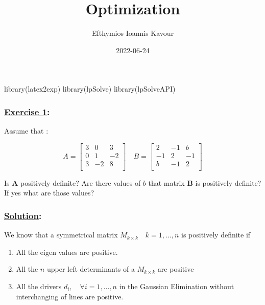 \documentclass[
]{article}
\title{Optimization}
\author{Efthymios Ioannis Kavour}
\date{2022-06-24}
\newenvironment{Shaded}{\begin{snugshade}}{\end{snugshade}}
\newcommand{\FunctionTok}[1]{\textcolor[rgb]{0.00,0.00,0.00}{#1}}
\newcommand{\NormalTok}[1]{#1}
\providecommand{\tightlist}{%
  \setlength{\itemsep}{0pt}\setlength{\parskip}{0pt}}
\begin{document}
\maketitle

\begin{Shaded}
\begin{Highlighting}[]
\FunctionTok{library}\NormalTok{(latex2exp)}
\FunctionTok{library}\NormalTok{(lpSolve)}
\FunctionTok{library}\NormalTok{(lpSolveAPI)}
\end{Highlighting}
\end{Shaded}

\hypertarget{section}{%
\subsubsection{\texorpdfstring{\underline{Exercise 1}:}{:}}\label{section}}

Assume that :

\[
A = \begin{bmatrix}
3   &  0    &  3 \\
0   &  1    & -2 \\
3   & -2    &  8 \\
\end{bmatrix}
\quad 
B = \begin{bmatrix}
 2  & -1  &  b   \\
-1  &  2  & -1   \\
 b  & -1  &  2   \\
\end{bmatrix}
\]

Is \(\textbf{A}\) positively definite? Are there values of
\(\textit{b}\) that matrix \(\textbf{B}\) is positively definite? If yes
what are those values?

\hypertarget{section-1}{%
\subsubsection{\texorpdfstring{\underline{Solution}:}{:}}\label{section-1}}

We know that a symmetrical matrix \(M_{k\times k}\quad k =1,\dots,n\) is
positively definite if

\begin{enumerate}
\def\labelenumi{\arabic{enumi}.}
\tightlist
\item
  All the eigen values are positive.
\item
  All the \(\textit{n}\) upper left determinants of a \(M_{k\times k}\)
  are positive
\item
  All the drivers \(d_i,\quad\forall i = 1,\dots,n\) in the Gaussian
  Elimination without interchanging of lines are positive.\\
\end{enumerate}
\end{document}
